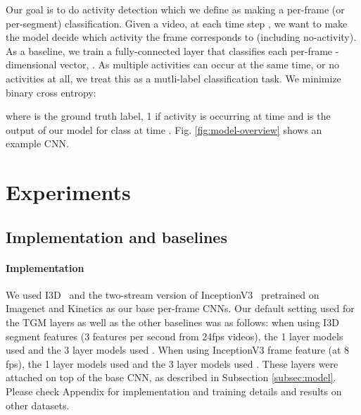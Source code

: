 \documentclass{article}
\begin{document}
Our goal is to do activity detection which we define as making a per-frame (or per-segment) classification. Given a video, at each time step , we want to make the model decide which activity the frame corresponds to (including no-activity). As a baseline, we train a fully-connected layer that classifies each per-frame -dimensional vector, . As multiple activities can occur at the same time, or no activities at all, we treat this as a mutli-label classification task. We minimize binary cross entropy:

where  is the ground truth label, 1 if activity  is occurring at time  and  is the output of our model for class  at time . Fig. \ref{fig:model-overview} shows an example CNN.




\section{Experiments}

\subsection{Implementation and baselines}
\label{subsec:implementation}

\paragraph{Implementation}

We used I3D~\citep{carreira2017quo} and the two-stream version of InceptionV3~\citep{szegedy2016rethinking} pretrained on Imagenet and Kinetics as our base per-frame CNNs. Our default  setting used for the TGM layers as well as the other baselines was as follows: when using I3D segment features (3 features per second from 24fps videos), the 1 layer models used  and the 3 layer models used . When using InceptionV3 frame feature (at 8 fps), the 1 layer models used  and the 3 layer models used . These layers were attached on top of the base CNN, as described in Subsection \ref{subsec:model}. Please check Appendix for implementation and training details and results on other datasets.
\end{document}
